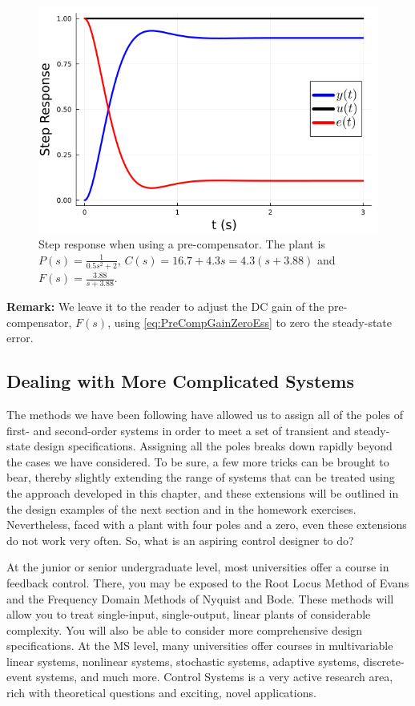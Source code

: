 \begin{figure}[bt]
      \centering
      \includegraphics[width = .4\linewidth]{graphics/Chap10/StepSecondOrderOscillatorPreComp.png}
    \caption[]{Step response when using a pre-compensator. The plant is $P(s)=\frac{1}{0.5s^2+2}$, $C(s)=16.7 + 4.3s = 4.3(s+3.88)$ and $F(s) = \frac{3.88}{s+3.88}$.}
    \label{fig:CascadeDesign:StepSecondOrderOscillatorPreComp}
  \end{figure}
\bigskip

\noindent \textbf{Remark:} We leave it to the reader to adjust the DC gain of the pre-compensator, $F(s)$, using \eqref{eq:PreCompGainZeroEss} to zero the steady-state error. 


\subsection{Dealing with More Complicated Systems}
\label{sec:CascadeDesign:HigherOrder}

 The methods we have been following have allowed us to assign all of the poles of first- and second-order systems in order to meet a set of transient and steady-state design specifications. Assigning all the poles breaks down rapidly beyond the cases we have considered. To be sure, a few more tricks can be brought to bear, thereby slightly extending the range of systems that can be treated using the approach developed in this chapter, and these extensions will be outlined in the design examples of the next section and in the homework exercises. Nevertheless, faced with a plant with four poles and a zero, even these extensions do not work very often. So, what is an aspiring control designer to do?

 At the junior or senior undergraduate level, most universities offer a course in feedback control. There, you may be exposed to the Root Locus Method of Evans and the Frequency Domain Methods of Nyquist and Bode. These methods will allow you to treat single-input, single-output, linear plants of considerable complexity. You will also be able to consider more comprehensive design specifications. At the MS level, many universities offer courses in multivariable linear systems, nonlinear systems, stochastic systems, adaptive systems, discrete-event systems, and much more. Control Systems is a very active research area, rich with theoretical questions and exciting, novel applications.

